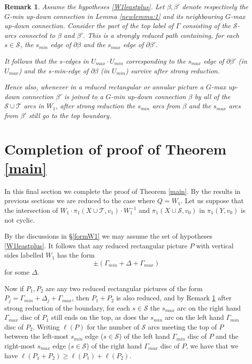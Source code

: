 \documentclass[12pt,a4paper]{amsart}
\def\G{\Gamma}
\def\D{\Delta}
\def\b{\beta}
\def\cS{\mathcal{S}}
\def\cT{\mathcal{T}}
\newtheorem{rmk}[thm]{Remark}
\begin{document}
\begin{rmk}\label{SminReduced}
 Assume the hypotheses \eqref{W1leastplus}.
Let $\b,\b'$ denote respectively the $G$-min up-down connection in Lemma \ref{newlemma:1}
and its neighbouring $G$-max up-down connection.  Consider the part of the top label of $\G$ consisting of the  $\cS$-arcs
connected to $\b$ and $\b'$.  
This is a strongly reduced path containing, for each $s\in\cS$, the $s_{min}$ edge of $\partial\b$ and the $s_{max}$ edge of $\partial\b'$.


It follows that the $s$-edges in $U_{max}\cdot U_{min}$ corresponding to the $s_{max}$ edge of $\partial\b'$ (in $U_{max}$) and the $s$-{min}-edge of $\partial\b$ (in $U_{min}$) survive after strong reduction.

Hence also, whenever in a reduced rectangular or annular picture  a $G$-max up-down connection $\b'$ is
joined to a $G$-min up-down connection $\b$ by all of the $\cS\cup\cT$ arcs in $W_1$, 
after strong reduction the $s_{min}$ arcs from $\b$ and the $s_{max}$ arcs from $\b'$ still go to the top boundary.
\end{rmk}


 
\section{Completion of proof of Theorem \ref{main}}\label{finalcurtain}  


In this final section we complete the proof of Theorem \ref{main}.  By the results in previous sections we are reduced to the case where $Q=W_1$.
Let us suppose that the intersection 
of  $W_1\cdot\pi_1(X\cup\cT,v_1)\cdot W_1^{-1}$ and $\pi_1(X\cup\cS,v_0)$ in $\pi_1(Y,v_0)$ is not cyclic.

 
By the discussions in \S \ref{formW1}  we may assume the set of hypotheses \eqref{W1leastplus}.
It follows that any reduced rectangular picture $P$ with vertical sides labelled $W_1$   has the form 
\begin{equation}\label{W4form}
\pm(\G_{min}+\D+\G_{max})
\end{equation}
for some $\D$.


Now if $P_1,P_2$ are any two reduced rectangular pictures of the form   $P_j=\G_{min}+\D_j+\G_{max}$, 
then $P_1+P_2$ is also reduced, and by Remark \ref{SminReduced} after strong reduction of the boundary, 
 for each $s\in\cS$
the $s_{max}$ arc on the right hand  $\G_{max}$ disc of $P_1$ still ends on the top, 
as does the $s_{min}$ arc on the left hand $\G_{min}$ disc of $P_2$.
Writing  
 $\ell(P)$ for the number of $\cS$ arcs meeting the top of $P$ between the   left-most $s_{min}$ edge ($s\in\cS$) of
the left hand  $\G_{min}$ disc of $P$ and 
the  right-most  $s_{max}$ edge ($s\in\cS$) of the right hand  $\G_{max}$ disc of $P$,
we have that 
we have $\ell(P_1+P_2) \ge \ell(P_1) + \ell(P_2)$.
\end{document}
